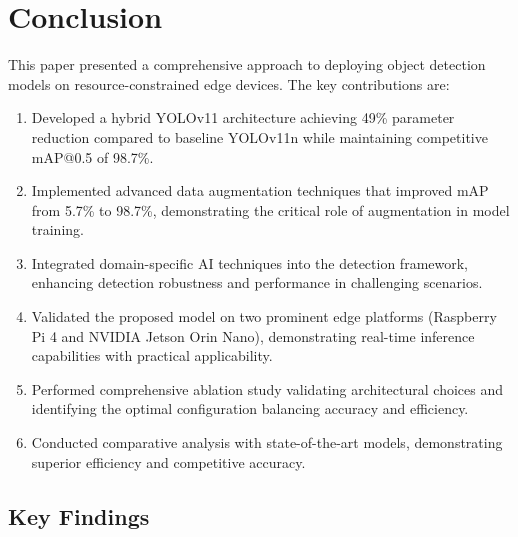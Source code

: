 \documentclass[11pt,a4paper]{article}
\begin{document}

\section{Conclusion}
\label{sec:conclusion}

This paper presented a comprehensive approach to deploying object detection models on resource-constrained 
edge devices. The key contributions are:

\begin{enumerate}
    \item Developed a hybrid YOLOv11 architecture achieving 49\% parameter reduction compared to baseline 
    YOLOv11n while maintaining competitive mAP@0.5 of 98.7\%.
    
    \item Implemented advanced data augmentation techniques that improved mAP from 5.7\% to 98.7\%, 
    demonstrating the critical role of augmentation in model training.
    
    \item Integrated domain-specific AI techniques into the detection framework, enhancing detection 
    robustness and performance in challenging scenarios.
    
    \item Validated the proposed model on two prominent edge platforms (Raspberry Pi 4 and NVIDIA 
    Jetson Orin Nano), demonstrating real-time inference capabilities with practical applicability.
    
    \item Performed comprehensive ablation study validating architectural choices and identifying the 
    optimal configuration balancing accuracy and efficiency.
    
    \item Conducted comparative analysis with state-of-the-art models, demonstrating superior efficiency 
    and competitive accuracy.
\end{enumerate}

\subsection{Key Findings}
\end{document}
